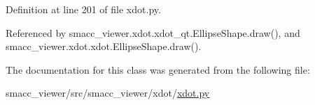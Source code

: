 Definition at line 201 of file xdot.\+py.



Referenced by smacc\+\_\+viewer.\+xdot.\+xdot\+\_\+qt.\+Ellipse\+Shape.\+draw(), and smacc\+\_\+viewer.\+xdot.\+xdot.\+Ellipse\+Shape.\+draw().



The documentation for this class was generated from the following file\+:\begin{DoxyCompactItemize}
\item 
smacc\+\_\+viewer/src/smacc\+\_\+viewer/xdot/\hyperlink{xdot_8py}{xdot.\+py}\end{DoxyCompactItemize}
